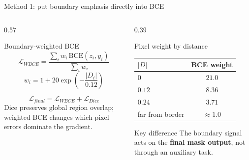 \documentclass[aspectratio=169,10pt]{beamer}
\begin{document}
\begin{frame}{Method 1: put boundary emphasis directly into BCE}
  \begin{columns}[T,onlytextwidth]
    \begin{column}{0.57\textwidth}
      \begin{block}{Boundary-weighted BCE}
        \small
        \[
          \mathcal{L}_{WBCE}
          = \frac{\sum_i w_i\,\mathrm{BCE}(z_i,y_i)}{\sum_i w_i}
        \]
        \vspace{-0.8em}
        \[
          w_i = 1 + 20\exp\!\left(-\frac{|D_i|}{0.12}\right)
        \]
      \end{block}
      \vspace{0.45em}
      \[
        \mathcal{L}_{final}
        = \mathcal{L}_{WBCE}+\mathcal{L}_{Dice}
      \]
      \small
      Dice preserves global region overlap; weighted BCE changes which pixel errors dominate the gradient.
    \end{column}
    \begin{column}{0.39\textwidth}
      \begin{block}{Pixel weight by distance}
        \centering
        \begin{tabular}{@{}lc@{}}
          \toprule
          $|D|$ & BCE weight \\
          \midrule
          $0$ & $\mathbf{21.0}$ \\
          $0.12$ & $8.36$ \\
          $0.24$ & $3.71$ \\
          far from border & $\approx1.0$ \\
          \bottomrule
        \end{tabular}
      \end{block}
      \vspace{0.55em}
      \begin{block}{Key difference}
        The boundary signal acts on the \textbf{final mask output}, not through an auxiliary task.
      \end{block}
    \end{column}
  \end{columns}
\end{frame}
\end{document}
